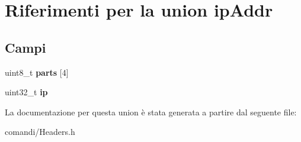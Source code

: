 \hypertarget{unionipAddr}{}\section{Riferimenti per la union ip\+Addr}
\label{unionipAddr}
\subsection*{Campi}
\begin{DoxyCompactItemize}
\item 
uint8\+\_\+t {\bfseries parts} \mbox{[}4\mbox{]}\hypertarget{unionipAddr_a556df322f89f52547482d24855a13049}{}\label{unionipAddr_a556df322f89f52547482d24855a13049}

\item 
uint32\+\_\+t {\bfseries ip}\hypertarget{unionipAddr_a55faff16e5463af66104860af56d915e}{}\label{unionipAddr_a55faff16e5463af66104860af56d915e}

\end{DoxyCompactItemize}


La documentazione per questa union è stata generata a partire dal seguente file\+:\begin{DoxyCompactItemize}
\item 
comandi/Headers.\+h\end{DoxyCompactItemize}
